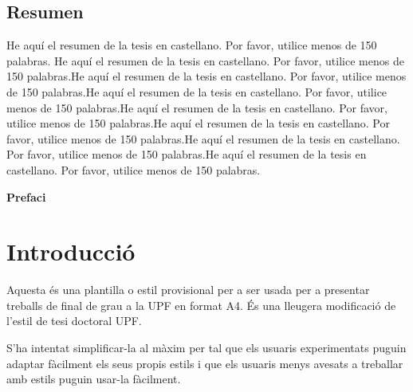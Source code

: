 \documentclass[11pt, a4paper,twoside]{tfg_dtic_upf}
\numberwithin{equation}{section}
\begin{document}
\section*{\Large \sffamily  Resumen}
He aquí el resumen de la tesis en castellano. Por favor, utilice
menos de 150 palabras. He aquí el resumen de la tesis en castellano. Por favor, utilice
menos de 150 palabras.He aquí el resumen de la tesis en castellano. Por favor, utilice
menos de 150 palabras.He aquí el resumen de la tesis en castellano. Por favor, utilice
menos de 150 palabras.He aquí el resumen de la tesis en castellano. Por favor, utilice
menos de 150 palabras.He aquí el resumen de la tesis en castellano. Por favor, utilice
menos de 150 palabras.He aquí el resumen de la tesis en castellano. Por favor, utilice
menos de 150 palabras.He aquí el resumen de la tesis en castellano. Por favor, utilice
menos de 150 palabras.
\vspace*{\fill}


\cleardoublepage

{\bf Prefaci}

\cleardoublepage


\tableofcontents

\listoffigures



\listoftables

\mainmatter
\chapter*{Introducció}

Aquesta és una plantilla o estil provisional per a ser usada per a presentar treballs de final de grau a la UPF en format A4. És una lleugera modificació de l'estil de tesi doctoral UPF. 

S'ha intentat simplificar-la al màxim per tal que els usuaris experimentats puguin adaptar fàcilment els seus propis estils i que els usuaris menys avesats a treballar amb estils puguin usar-la fàcilment. 
\end{document}
